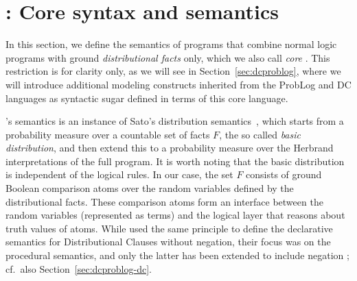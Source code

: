 \section{\dcproblogsty: Core syntax and semantics}\label{sec:semantics}


In this section, we define the semantics of  \dcproblogsty programs that combine normal logic programs with ground \emph{distributional facts} only, which we also call \emph{core} \dcproblogsty. 
This restriction is for clarity only, 
as we will see in Section~\ref{sec:dcproblog}, where 
we will introduce additional modeling constructs inherited from the ProbLog and DC languages as syntactic sugar defined in terms of this core language. 

\dcproblogsty's semantics is an instance of  Sato's distribution semantics~\citep{sato1995statistical}, which starts from a probability measure over a countable set of facts $F$, the so called \emph{basic distribution},  and then extend this to a probability measure over the Herbrand interpretations of the full program. It is worth noting that the basic distribution is independent of the logical rules. 
In our case, the set $F$ consists of ground Boolean comparison atoms over the random variables defined by the distributional facts. These comparison atoms form an interface between the random variables (represented as terms) and the logical layer that reasons about truth values of atoms. 
While \cite{gutmann2011magic} used the same principle to define the declarative semantics for Distributional Clauses without negation, their focus was on the procedural semantics, and only the latter has been extended to include negation \citep{nitti2016probabilistic}; cf.~also Section~\ref{sec:dcproblog-dc}.





